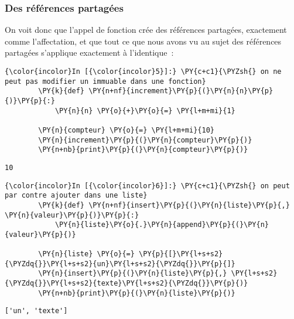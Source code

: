     \hypertarget{des-ruxe9fuxe9rences-partaguxe9es}{%
\subsubsection{Des références
partagées}\label{des-ruxe9fuxe9rences-partaguxe9es}}

    On voit donc que l'appel de fonction crée des références partagées,
exactement comme l'affectation, et que tout ce que nous avons vu au
sujet des références partagées s'applique exactement à l'identique~:

    \begin{Verbatim}[commandchars=\\\{\},frame=single,framerule=0.3mm,rulecolor=\color{cellframecolor}]
{\color{incolor}In [{\color{incolor}5}]:} \PY{c+c1}{\PYZsh{} on ne peut pas modifier un immuable dans une fonction}
        \PY{k}{def} \PY{n+nf}{increment}\PY{p}{(}\PY{n}{n}\PY{p}{)}\PY{p}{:}
            \PY{n}{n} \PY{o}{+}\PY{o}{=} \PY{l+m+mi}{1}
        
        \PY{n}{compteur} \PY{o}{=} \PY{l+m+mi}{10}
        \PY{n}{increment}\PY{p}{(}\PY{n}{compteur}\PY{p}{)}
        \PY{n+nb}{print}\PY{p}{(}\PY{n}{compteur}\PY{p}{)}
\end{Verbatim}


    \begin{Verbatim}[commandchars=\\\{\},frame=single,framerule=0.3mm,rulecolor=\color{cellframecolor}]
10
\end{Verbatim}

    \begin{Verbatim}[commandchars=\\\{\},frame=single,framerule=0.3mm,rulecolor=\color{cellframecolor}]
{\color{incolor}In [{\color{incolor}6}]:} \PY{c+c1}{\PYZsh{} on peut par contre ajouter dans une liste}
        \PY{k}{def} \PY{n+nf}{insert}\PY{p}{(}\PY{n}{liste}\PY{p}{,} \PY{n}{valeur}\PY{p}{)}\PY{p}{:}
            \PY{n}{liste}\PY{o}{.}\PY{n}{append}\PY{p}{(}\PY{n}{valeur}\PY{p}{)}
            
        \PY{n}{liste} \PY{o}{=} \PY{p}{[}\PY{l+s+s2}{\PYZdq{}}\PY{l+s+s2}{un}\PY{l+s+s2}{\PYZdq{}}\PY{p}{]}
        \PY{n}{insert}\PY{p}{(}\PY{n}{liste}\PY{p}{,} \PY{l+s+s2}{\PYZdq{}}\PY{l+s+s2}{texte}\PY{l+s+s2}{\PYZdq{}}\PY{p}{)}
        \PY{n+nb}{print}\PY{p}{(}\PY{n}{liste}\PY{p}{)}
\end{Verbatim}


    \begin{Verbatim}[commandchars=\\\{\},frame=single,framerule=0.3mm,rulecolor=\color{cellframecolor}]
['un', 'texte']
\end{Verbatim}

